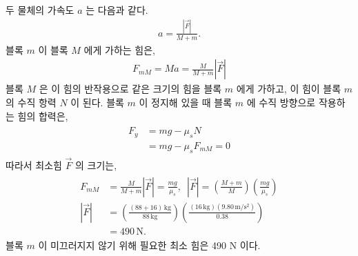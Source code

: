 \documentclass[floatfix,nofootinbib,superscriptaddress,fleqn,preprint]{revtex4}
\begin{document}
두 물체의 가속도 $a$ 는 다음과 같다.
\begin{align}
  a = \frac{|\vec{F}|}{M+m}.
\end{align}
 블록 $m$ 이 블록 $M$ 에게 가하는 힘은,
 \begin{align}
   F_{mM} = Ma = \frac{M}{M+m}|\vec{F}|
 \end{align} 
 블록 $M$ 은 이 힘의 반작용으로 같은 크기의 힘을 블록 $m$ 에게 가하고, 
 이 힘이 블록 $m$ 의 수직 항력 $N$ 이 된다. 블록 $m$ 이 정지해 있을 때 
 블록 $m$ 에 수직 방향으로 작용하는 힘의 합력은,
 \begin{align}
  \begin{split}
    F_y &= mg - \mu_sN \\
    &= mg - \mu_s F_{mM} = 0
  \end{split}
 \end{align}
 따라서 최소힘 $\vec{F}$ 의 크기는,
 \begin{align}
   \begin{split}
     F_{mM} &= \frac{M}{M+m}|\vec{F}| =\frac{mg}{\mu_s},\,\,\,
     |\vec{F}| = \left(\frac{M+m}{M}\right)\left(\frac{mg}{\mu_s}\right)  \\
     |\vec{F}| &= \left(\frac{(88+16)\,\mathrm{kg}}{88\,\mathrm{kg}}\right)
     \left(\frac{(16\,\mathrm{kg})(9.80\,\mathrm{m/s^2})}{0.38}\right)  \\
     &= 490\,\mathrm{N}.
   \end{split}
 \end{align}
 블록 $m$ 이 미끄러지지 않기 위해 필요한 최소 힘은 490 N 이다.
\end{document}
